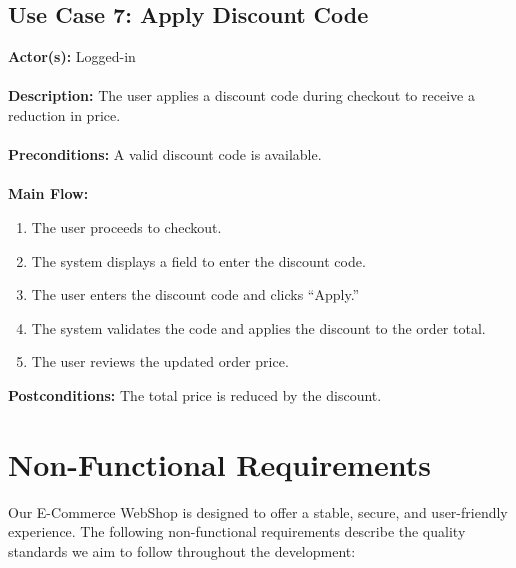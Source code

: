 \documentclass[a4paper,12pt]{article}
\begin{document}
	\subsection*{Use Case 7: Apply Discount Code}
	\textbf{Actor(s):} Logged-in \\ \\
	\textbf{Description:} The user applies a discount code during checkout to receive a \\ reduction in
	price. \\ \\
	\textbf{Preconditions:} A valid discount code is available. \\ \\
	\textbf{Main Flow:}
	\begin{enumerate}
  		\item The user proceeds to checkout.
  		\item The system displays a field to enter the discount code.
  		\item The user enters the discount code and clicks ``Apply.''
  		\item The system validates the code and applies the discount to the order total.
  		\item The user reviews the updated order price.
	\end{enumerate}
	\textbf{Postconditions:} The total price is reduced by the discount.

	
	\section{Non-Functional Requirements}  

Our E-Commerce WebShop is designed to offer a stable, secure, and user-friendly experience. The following non-functional requirements describe the quality standards we aim to follow throughout the development:
\end{document}
